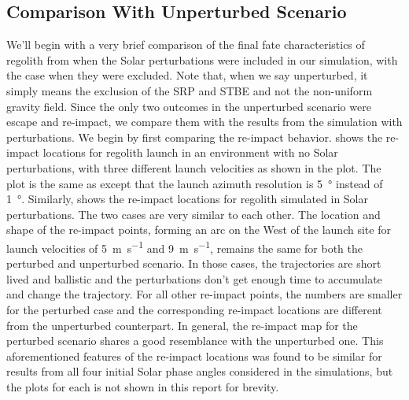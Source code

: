 \subsection{Comparison With Unperturbed Scenario}
\label{subsec:noSP_comparison_reimpact_and_escape}
We'll begin with a very brief comparison of the final fate characteristics of regolith from when the Solar perturbations were included in our simulation, with the case when they were excluded. Note that, when we say unperturbed, it simply means the exclusion of the \gls{SRP} and \gls{STBE} and not the non-uniform gravity field. Since the only two outcomes in the unperturbed scenario were escape and re-impact, we compare them with the results from the simulation with perturbations.
%
\newline\newline
%
We begin by first comparing the re-impact behavior.  shows the re-impact locations for regolith launch in an environment with no Solar perturbations, with three different launch velocities as shown in the plot. The plot is the same as  except that the launch azimuth resolution is \SI{5}{\degree} instead of \SI{1}{\degree}. Similarly,  shows the re-impact locations for regolith simulated in Solar perturbations. The two cases are very similar to each other. The location and shape of the re-impact points, forming an arc on the West of the launch site for launch velocities of \SI{5}{\metre\per\second} and \SI{9}{\metre\per\second}, remains the same for both the perturbed and unperturbed scenario. In those cases, the trajectories are short lived and ballistic and the perturbations don't get enough time to accumulate and change the trajectory. For all other re-impact points, the numbers are smaller for the perturbed case and the corresponding re-impact locations are different from the unperturbed counterpart. In general, the re-impact map for the perturbed scenario shares a good resemblance with the unperturbed one. This aforementioned features of the re-impact locations was found to be similar for results from all four initial Solar phase angles considered in the simulations, but the plots for each is not shown in this report for brevity.
